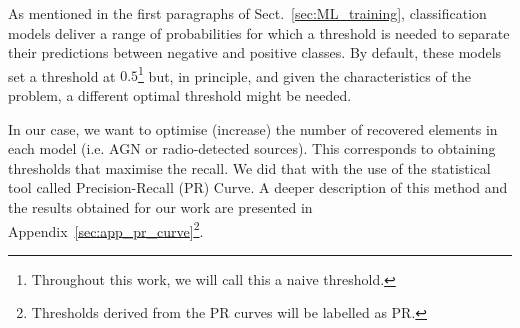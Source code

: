 \documentclass{aa}
\begin{document}
As mentioned in the first paragraphs of Sect.~\ref{sec:ML_training}, classification models deliver a range of probabilities for which a threshold is needed to separate their predictions between negative and positive classes. By default, these models set a threshold at $0.5$\footnote{Throughout this work, we will call this a naive threshold.} but, in principle, and given the characteristics of the problem, a different optimal threshold might be needed.

In our case, we want to optimise (increase) the number of recovered elements in each model (i.e. AGN or radio-detected sources). This corresponds to obtaining thresholds that maximise the recall. We did that with the use of the statistical tool called Precision-Recall (PR) Curve. A deeper description of this method and the results obtained for our work are presented in Appendix~\ref{sec:app_pr_curve}\footnote{Thresholds derived from the PR curves will be labelled as PR.}.



\begin{table}
\caption{Best performing models for the AGN-galaxy classification}             %
\label{table:fit_AGN_models}      %
\centering                          %
\end{table}
\end{document}
